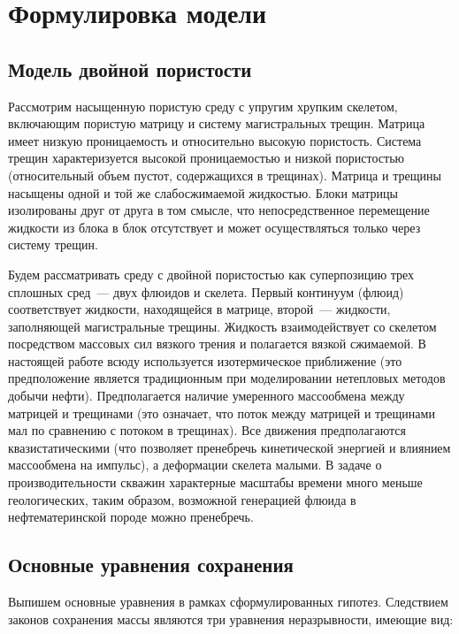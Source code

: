 \chapter{Формулировка модели}\label{ch:ch1}

\section{Модель двойной пористости}\label{sec:ch1/sec00}

Рассмотрим насыщенную пористую среду с упругим хрупким скелетом, включающим пористую матрицу и систему магистральных трещин. Матрица имеет низкую проницаемость и относительно высокую пористость. Система трещин характеризуется высокой проницаемостью и низкой пористостью (относительный объем пустот, содержащихся в трещинах). Матрица и трещины насыщены одной и той же слабосжимаемой жидкостью. Блоки матрицы изолированы друг от друга в том смысле, что непосредственное перемещение жидкости из блока в блок отсутствует и может осуществляться только через систему трещин.

Будем рассматривать среду с двойной пористостью как суперпозицию трех сплошных сред~--- двух флюидов и скелета. Первый континуум (флюид) соответствует жидкости, находящейся в матрице, второй~--- жидкости, заполняющей магистральные трещины. Жидкость взаимодействует со скелетом посредством массовых сил вязкого трения и полагается вязкой сжимаемой. В настоящей работе всюду используется изотермическое приближение (это предположение является традиционным при моделировании нетепловых методов добычи нефти). Предполагается наличие умеренного массообмена между матрицей и трещинами (это означает, что поток между матрицей и трещинами мал по сравнению с потоком в трещинах). Все движения предполагаются квазистатическими (что позволяет пренебречь кинетической энергией и влиянием массообмена на импульс), а деформации скелета малыми. В задаче о производительности скважин характерные масштабы времени много меньше геологических, таким образом, возможной генерацией флюида в нефтематеринской породе можно пренебречь.

\section{Основные уравнения сохранения}\label{sec:ch1/sec01}

Выпишем основные уравнения в рамках сформулированных гипотез. Следствием законов сохранения массы являются три уравнения неразрывности, имеющие вид:

